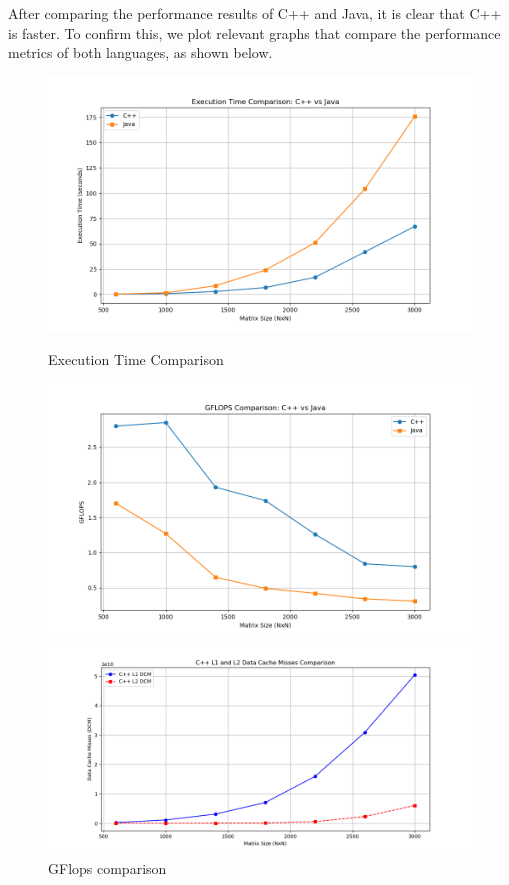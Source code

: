 \documentclass{article}
\begin{document}
After comparing the performance results of C++ and Java, it is clear that C++ is faster. To confirm this, we plot relevant graphs that compare the performance metrics of both languages, as shown below.

\begin{figure}[H]
    \centering
    \begin{minipage}{0.32\textwidth}
        \centering
        \includegraphics[width=\textwidth]{Figure_1.png}
        \caption{\small Execution Time Comparison}
        \label{fig:execution_time}
    \end{minipage}
    \hfill
    \begin{minipage}{0.32\textwidth}
        \centering
        \includegraphics[width=\textwidth]{Figure_2.png}
        \caption{\small GFlops comparison}
        \label{fig:flops}
    \end{minipage}
    \hfill
    \begin{minipage}{0.32\textwidth}
        \centering
        \includegraphics[width=\textwidth]{Figure_3.png}

\end{minipage}
\end{figure}
\end{document}
